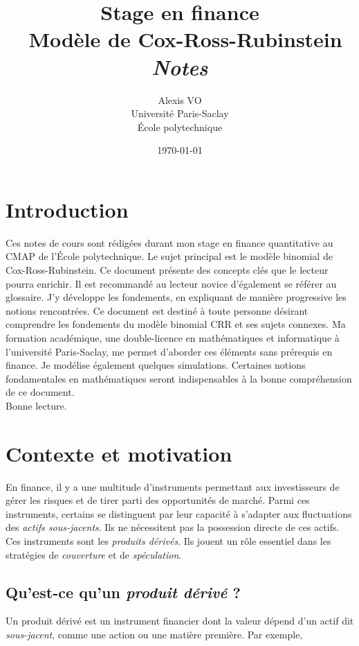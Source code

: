 \documentclass[12pt,a4paper]{article}
\title{\Huge{\textbf{Stage en finance\\ Modèle de Cox-Ross-Rubinstein}}\\ \medskip
      \Huge{\textit{Notes}}\vspace*{0.7cm}}
\author{\LARGE{Alexis VO}\vspace{1cm}\\ \medskip
      Université Paris-Saclay\\École polytechnique}
\date{\vspace{0.2cm}\today}
\begin{document}
\renewcommand\labelitemi{\textbullet}

\maketitle

\newpage

\section*{Introduction}
Ces notes de cours sont rédigées durant mon stage en finance quantitative au CMAP de l'École polytechnique. Le sujet principal est le modèle binomial de Cox-Ross-Rubinstein. Ce document présente des concepts clés que le lecteur pourra enrichir. Il est recommandé au lecteur novice d'également se référer au glossaire. J'y développe les fondements, en expliquant de manière progressive les notions rencontrées.  Ce document est destiné à toute personne désirant comprendre les fondements du modèle binomial CRR et ses sujets connexes. Ma formation académique, une double-licence en mathématiques et informatique à l'université Paris-Saclay, me permet d'aborder ces éléments sans prérequis en finance. Je modélise également quelques simulations. Certaines notions fondamentales en mathématiques seront indispensables à la bonne compréhension de ce document.\\Bonne lecture.

\newpage

\tableofcontents

\newpage

\section{Contexte et motivation}
En finance, il y a une multitude d'instruments permettant aux investisseurs de gérer les risques et de tirer parti des opportunités de marché. Parmi ces instruments, certains se distinguent par leur capacité à s'adapter aux fluctuations des \textit{actifs sous-jacents}. Ils ne nécessitent pas la possession directe de ces actifs. Ces instruments sont les \textit{produits dérivés}. Ils jouent un rôle essentiel dans les stratégies de \textit{couverture} et de \textit{spéculation}.

\subsection{Qu'est-ce qu'un \textit{produit dérivé} ?}
Un produit dérivé est un instrument financier dont la valeur dépend d'un actif dit \textit{sous-jacent}, comme une action ou une matière première. Par exemple,
\end{document}
